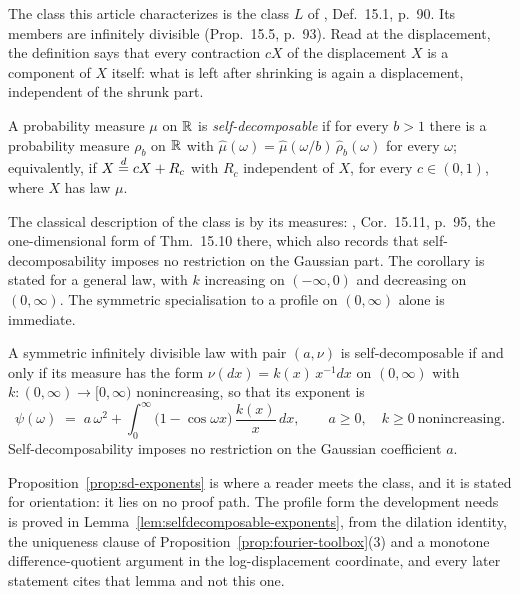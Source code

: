The class this article characterizes is the class $L$ of , Def.~15.1,
p.~90. Its members are infinitely divisible (Prop.~15.5, p.~93). Read at the displacement,
the definition says that every contraction $cX$ of the displacement $X$ is a component of $X$
itself: what is left after shrinking is again a displacement, independent of the shrunk part.

\begin{definition}\label{def:self-decomposable}
A probability measure $\mu$ on $\mathbb{R}$ is \emph{self-decomposable} if for every $b > 1$ there is
a probability measure $\rho_b$ on $\mathbb{R}$ with
$\hat\mu(\omega) = \hat\mu(\omega/b)\,\hat\rho_b(\omega)$ for every $\omega$; equivalently, if
$X \stackrel{d}{=} cX + R_c$ with $R_c$ independent of $X$, for every $c \in (0,1)$, where $X$ has law
$\mu$.
\end{definition}

The classical description of the class is by its \Levy{} measures: ,
Cor.~15.11, p.~95, the one-dimensional form of Thm.~15.10 there, which also records that
self-decomposability imposes no restriction on the Gaussian part. The corollary is stated
for a general law, with $k$ increasing on $(-\infty,0)$ and decreasing on $(0,\infty)$. The
symmetric specialisation to a profile on $(0,\infty)$ alone is immediate.

\begin{proposition}\label{prop:sd-exponents}
A symmetric infinitely divisible law with pair $(a,\nu)$ is self-decomposable if and only if
its \Levy{} measure has the form $\nu(dx) = k(x)\,x^{-1}dx$ on $(0,\infty)$ with
$k : (0,\infty) \to [0,\infty)$ nonincreasing, so that its exponent is
\begin{equation}\label{eq:sd-profile}
  \psi(\omega) \;=\; a\,\omega^2
  + \int_0^\infty \bigl(1 - \cos\omega x\bigr)\,\frac{k(x)}{x}\,dx,
  \qquad a \ge 0, \quad k \ge 0 \ \text{nonincreasing}.
\end{equation}
Self-decomposability imposes no restriction on the Gaussian coefficient $a$.
\end{proposition}

Proposition~\ref{prop:sd-exponents} is where a reader meets the class, and it is stated for
orientation: it lies on no proof path. The profile form the development needs is proved in
Lemma~\ref{lem:selfdecomposable-exponents}, from the dilation identity, the uniqueness
clause of Proposition~\ref{prop:fourier-toolbox}(3) and a monotone difference-quotient
argument in the log-displacement coordinate, and every later statement cites that lemma and
not this one.

